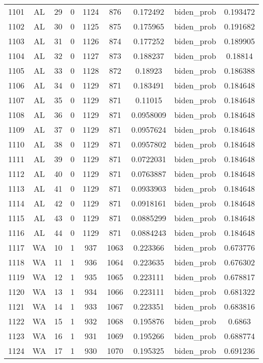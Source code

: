 \documentclass[12pt,a4paper]{article}
\begin{document}
\begin{tabular}{r|cccccccc}
	1101 & AL & 29 & 0 & 1124 & 876 & 0.172492 & biden\_prob & 0.193472 \\
	1102 & AL & 30 & 0 & 1125 & 875 & 0.175965 & biden\_prob & 0.191682 \\
	1103 & AL & 31 & 0 & 1126 & 874 & 0.177252 & biden\_prob & 0.189905 \\
	1104 & AL & 32 & 0 & 1127 & 873 & 0.188237 & biden\_prob & 0.18814 \\
	1105 & AL & 33 & 0 & 1128 & 872 & 0.18923 & biden\_prob & 0.186388 \\
	1106 & AL & 34 & 0 & 1129 & 871 & 0.183491 & biden\_prob & 0.184648 \\
	1107 & AL & 35 & 0 & 1129 & 871 & 0.11015 & biden\_prob & 0.184648 \\
	1108 & AL & 36 & 0 & 1129 & 871 & 0.0958009 & biden\_prob & 0.184648 \\
	1109 & AL & 37 & 0 & 1129 & 871 & 0.0957624 & biden\_prob & 0.184648 \\
	1110 & AL & 38 & 0 & 1129 & 871 & 0.0957802 & biden\_prob & 0.184648 \\
	1111 & AL & 39 & 0 & 1129 & 871 & 0.0722031 & biden\_prob & 0.184648 \\
	1112 & AL & 40 & 0 & 1129 & 871 & 0.0763887 & biden\_prob & 0.184648 \\
	1113 & AL & 41 & 0 & 1129 & 871 & 0.0933903 & biden\_prob & 0.184648 \\
	1114 & AL & 42 & 0 & 1129 & 871 & 0.0918161 & biden\_prob & 0.184648 \\
	1115 & AL & 43 & 0 & 1129 & 871 & 0.0885299 & biden\_prob & 0.184648 \\
	1116 & AL & 44 & 0 & 1129 & 871 & 0.0884243 & biden\_prob & 0.184648 \\
	1117 & WA & 10 & 1 & 937 & 1063 & 0.223366 & biden\_prob & 0.673776 \\
	1118 & WA & 11 & 1 & 936 & 1064 & 0.223635 & biden\_prob & 0.676302 \\
	1119 & WA & 12 & 1 & 935 & 1065 & 0.223111 & biden\_prob & 0.678817 \\
	1120 & WA & 13 & 1 & 934 & 1066 & 0.223111 & biden\_prob & 0.681322 \\
	1121 & WA & 14 & 1 & 933 & 1067 & 0.223351 & biden\_prob & 0.683816 \\
	1122 & WA & 15 & 1 & 932 & 1068 & 0.195876 & biden\_prob & 0.6863 \\
	1123 & WA & 16 & 1 & 931 & 1069 & 0.195266 & biden\_prob & 0.688774 \\
	1124 & WA & 17 & 1 & 930 & 1070 & 0.195325 & biden\_prob & 0.691236 \\

\end{tabular}
\end{document}
